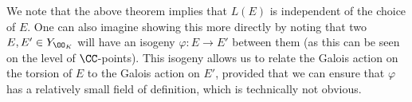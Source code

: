 \documentclass[../notes.tex]{subfiles}
\begin{document}
\begin{remark}
	We note that the above theorem implies that $L(E)$ is independent of the choice of $E$. One can also imagine showing this more directly by noting that two $E,E'\in Y_{\OO_K}$ will have an isogeny $\varphi\colon E\to E'$ between them (as this can be seen on the level of $\CC$-points). This isogeny allows us to relate the Galois action on the torsion of $E$ to the Galois action on $E'$, provided that we can ensure that $\varphi$ has a relatively small field of definition, which is technically not obvious.
\end{remark}
\end{document}
